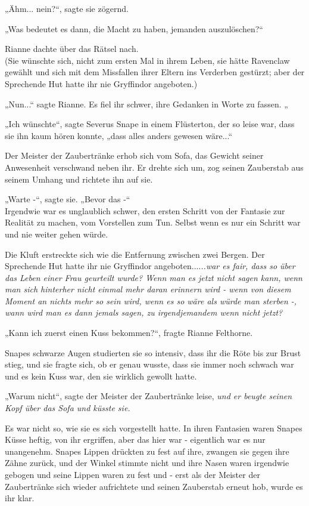 {„Ähm... nein?“, sagte sie zögernd.

„Was bedeutet es dann, die Macht zu haben, jemanden auszulöschen?“

Rianne dachte über das Rätsel nach.\\ (Sie wünschte sich, nicht zum ersten Mal in ihrem Leben, sie hätte Ravenclaw gewählt und sich mit dem Missfallen ihrer Eltern ins Verderben gestürzt; aber der Sprechende Hut hatte ihr nie Gryffindor angeboten.)

„Nun...“ sagte Rianne. Es fiel ihr schwer, ihre Gedanken in Worte zu fassen. „

„Ich wünschte“, sagte Severus Snape in einem Flüsterton, der so leise war, dass sie ihn kaum hören konnte, „dass alles anders gewesen wäre...“

Der Meister der Zaubertränke erhob sich vom Sofa, das Gewicht seiner Anwesenheit verschwand neben ihr. Er drehte sich um, zog seinen Zauberstab aus seinem Umhang und richtete ihn auf sie.

„Warte -“, sagte sie. „Bevor das -“\\ Irgendwie war es unglaublich schwer, den ersten Schritt von der Fantasie zur Realität zu machen, vom Vorstellen zum Tun. Selbst wenn es nur ein Schritt war und nie weiter gehen würde.

Die Kluft erstreckte sich wie die Entfernung zwischen zwei Bergen. Der Sprechende Hut hatte ihr nie Gryffindor angeboten....\emph{..war es fair, dass so über das Leben einer Frau geurteilt wurde? Wenn man es jetzt nicht sagen kann, wenn man sich hinterher nicht einmal mehr daran erinnern wird - wenn von diesem Moment an nichts mehr so sein wird, wenn es so wäre als würde man sterben -, wann wird man es dann jemals sagen, zu irgendjemandem wenn nicht jetzt?}

„Kann ich zuerst einen Kuss bekommen?“, fragte Rianne Felthorne.

Snapes schwarze Augen studierten sie so intensiv, dass ihr die Röte bis zur Brust stieg, und sie fragte sich, ob er genau wusste, dass sie immer noch schwach war und es kein Kuss war, den sie wirklich gewollt hatte.

„Warum nicht“, sagte der Meister der Zaubertränke leise, \emph{und er beugte seinen Kopf über das Sofa und küsste sie.}

Es war nicht so, wie sie es sich vorgestellt hatte. In ihren Fantasien waren Snapes Küsse heftig, von ihr ergriffen, aber das hier war - eigentlich war es nur unangenehm. Snapes Lippen drückten zu fest auf ihre, zwangen sie gegen ihre Zähne zurück, und der Winkel stimmte nicht und ihre Nasen waren irgendwie gebogen und seine Lippen waren zu fest und - erst als der Meister der Zaubertränke sich wieder aufrichtete und seinen Zauberstab erneut hob, wurde es ihr klar.

}

